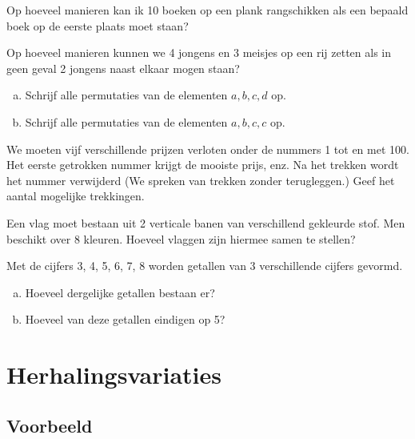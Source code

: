 \documentclass[12pt,twoside]{article}
\begin{document}
\begin{oefening}
Op hoeveel manieren kan ik 10 boeken op een plank rangschikken als een bepaald boek op de eerste plaats moet staan?
\end{oefening}

\begin{oefening}
Op hoeveel manieren kunnen we 4 jongens en 3 meisjes op een rij zetten als in geen geval 2 jongens naast elkaar mogen staan?
\end{oefening}

\begin{oefening}
\begin{enumerate}[(a)]
  \item Schrijf alle permutaties van de elementen $a,b,c,d$ op.
  \item Schrijf alle permutaties van de elementen $a,b,c,c$ op.
\end{enumerate}
\end{oefening}

\begin{oefening}
We moeten vijf verschillende prijzen verloten onder de nummers 1 tot en met 100.
Het eerste getrokken nummer krijgt de mooiste prijs, enz. Na het trekken wordt het
nummer verwijderd (We spreken van trekken zonder terugleggen.)
Geef het aantal mogelijke trekkingen.
\end{oefening}

\begin{oefening}
Een vlag moet bestaan uit 2 verticale banen van verschillend gekleurde stof.
Men beschikt over 8 kleuren. Hoeveel vlaggen zijn hiermee samen te stellen?
\end{oefening}

\begin{oefening}
Met de cijfers 3, 4, 5, 6, 7, 8 worden getallen van 3 verschillende cijfers gevormd.
\begin{enumerate}[(a)]
  \item Hoeveel dergelijke getallen bestaan er?
  \item Hoeveel van deze getallen eindigen op 5?
\end{enumerate}
\end{oefening}

\pagebreak

\section{Herhalingsvariaties}

\subsection{Voorbeeld}
\end{document}
